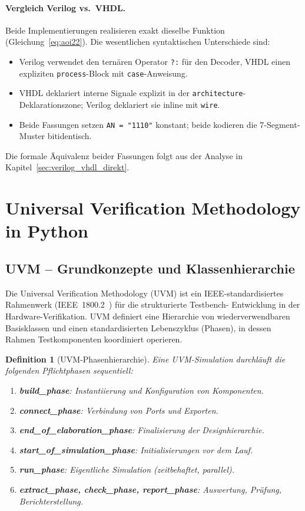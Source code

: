 ﻿\documentclass[12pt,a4paper]{report}
\newtheorem{definition}{Definition}[section]
\begin{document}
\paragraph{Vergleich Verilog vs.\ VHDL.}
Beide Implementierungen realisieren exakt dieselbe Funktion (Gleichung~\ref{eq:aoi22}).
Die wesentlichen syntaktischen Unterschiede sind:
\begin{itemize}
    \item Verilog verwendet den ternären Operator \texttt{?:} für den Decoder,
          VHDL einen expliziten \texttt{process}-Block mit \texttt{case}-Anweisung.
    \item VHDL deklariert interne Signale explizit in der \texttt{architecture}-
          Deklarationszone; Verilog deklariert sie inline mit \texttt{wire}.
    \item Beide Fassungen setzen \texttt{AN = "1110"} konstant; beide kodieren
          die 7-Segment-Muster bitidentisch.
\end{itemize}
Die formale Äquivalenz beider Fassungen folgt aus der Analyse in
Kapitel~\ref{sec:verilog_vhdl_direkt}.

\section{Universal Verification Methodology in Python}
\label{subsec:pyuvm_framework}

\subsection{UVM -- Grundkonzepte und Klassen\-hierarchie}

Die Universal Verification Methodology (UVM) ist ein IEEE-standardisiertes
Rahmenwerk (IEEE~1800.2~\cite{uvm2020}) für die strukturierte Testbench-
Entwicklung in der Hardware-Verifikation. UVM definiert eine Hierarchie von
wiederverwendbaren Basisklassen und einen standardisierten Lebenszyklus
(Phasen), in dessen Rahmen Testkomponenten koordiniert operieren.

\begin{definition}[UVM-Phasenhierarchie]
Eine UVM-Simulation durchläuft die folgenden Pflichtphasen sequentiell:
\begin{enumerate}
    \item \textbf{build\_phase}: Instantiierung und Konfiguration von Komponenten.
    \item \textbf{connect\_phase}: Verbindung von Ports und Exporten.
    \item \textbf{end\_of\_elaboration\_phase}: Finalisierung der Designhierarchie.
    \item \textbf{start\_of\_simulation\_phase}: Initialisierungen vor dem Lauf.
    \item \textbf{run\_phase}: Eigentliche Simulation (zeitbehaftet, parallel).
    \item \textbf{extract\_phase, check\_phase, report\_phase}: Auswertung, Prüfung, Berichterstellung.
\end{enumerate}
\end{definition}
\end{document}
